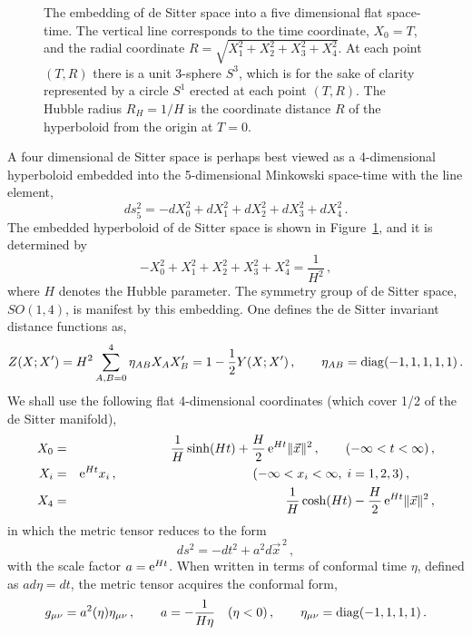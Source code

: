 \begin{figure}[tbp]
\vskip -0.1in
\begin{center}
\end{center}
 \label{figure 1} 
\vskip -0.3in
\caption[fig0]{
\small
The embedding of de Sitter space into a five dimensional flat space-time.
The vertical line corresponds to the time coordinate, $X_0=T$,
and the radial coordinate $R=\sqrt{X_1^2+X_2^2+X_3^2+X_4^2}$.
 At each point $(T,R)$ there is a unit 3-sphere $S^3$, which is for
the sake of clarity represented by a circle $S^1$ erected at each
point $(T,R)$. The Hubble radius $R_H=1/H$
is the coordinate distance $R$ of the hyperboloid from the origin at $T=0$.
}
\end{figure}
A four dimensional de  Sitter space is perhaps best viewed as a 4-dimensional
hyperboloid embedded into the 5-dimensional Minkowski space-time
with the line element,
\begin{equation}
 ds_5^2 =  - dX_0 ^2 + dX_1^2 + dX_2^2 + dX_3^2 + dX_4^2
\label{dS:5 dim}
\,.
\end{equation}
The embedded hyperboloid of de Sitter space is shown in
Figure~\ref{figure 1}, and it is determined by
\begin{equation}
\label{dS:hyperboloid}
 - X_0^2 + X_1^2 + X_2^2 + X_3^2 + X_4^2  = \frac{1}{H^2}
\,,
\end{equation}
where $H$ denotes the Hubble parameter.
The symmetry group of de Sitter space,
$SO(1,4)$, is manifest by this embedding. One defines the de Sitter
invariant distance functions as,
\begin{equation}
 Z(X;X^\prime) = H^2 \sum_{A,B=0}^4\eta_{AB}X_A X^\prime_B
               = 1 - \frac{1}{2}Y(X;X^\prime)
\,,\qquad
\eta_{AB} = {\rm diag}(-1,1,1,1,1)
\,.
\label{invariant distance}
\end{equation}
We shall use the following flat 4-dimensional coordinates (which
cover 1/2 of the de Sitter manifold),
\begin{eqnarray}
  X_0 &=& \frac{1}{H}\sinh(Ht)+\frac{H}{2}\,{\rm e}^{Ht}\|\vec x\|^2
  \,,\qquad
            (-\infty < t < \infty)\,,
\nonumber\\
 X_i &=& {\rm e}^{Ht}x_i
  \,,\qquad\qquad\qquad\qquad\qquad\quad\!\!
            (-\infty < x_i < \infty,\; i=1,2,3)\,,\qquad
\nonumber\\
 X_4 &=& \frac{1}{H}\cosh(Ht)-\frac{H}{2}\,{\rm e}^{Ht}\|\vec x\|^2
\,,
\label{dS:flat coordinates}
\end{eqnarray}
in which the metric tensor reduces to the form
\begin{equation}
ds^2 = -dt^2 + a^2d\vec{x}^{\,2}\,,
\end{equation}
with the scale factor $a={\rm e}^{Ht}$. When written in terms of
conformal time $\eta$, defined as $ad\eta = dt$, the metric tensor
acquires the conformal form,
\begin{equation}
 g_{\mu\nu} = a^2(\eta) \eta_{\mu\nu}
\,,\qquad
 a = -\frac{1}{H\eta} \quad (\eta<0)
\,,\qquad
\eta_{\mu\nu} = {\rm diag}(-1,1,1,1)
\,.
\label{dS:scale factor}
\end{equation}

